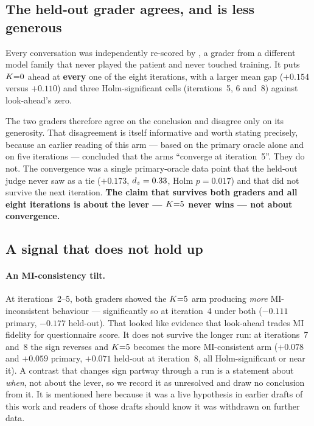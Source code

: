 \subsection{The held-out grader agrees, and is less generous}
Every conversation was independently re-scored by \heldout{}, a grader from a different model
family that never played the patient and never touched training. It puts $K{=}0$ ahead at
\textbf{every} one of the eight iterations, with a larger mean gap ($+0.154$ versus $+0.110$)
and three Holm-significant cells (iterations~5, 6 and~8) against look-ahead's zero.

The two graders therefore agree on the conclusion and disagree only on its generosity. That
disagreement is itself informative and worth stating precisely, because an earlier reading of
this arm --- based on the primary oracle alone and on five iterations --- concluded that the
arms ``converge at iteration~5''. They do not. The convergence was a single primary-oracle
data point that the held-out judge never saw as a tie ($+0.173$, $d_z = 0.33$, Holm
$p = 0.017$) and that did not survive the next iteration. \textbf{The claim that survives both
graders and all eight iterations is about the lever --- $K{=}5$ never wins --- not about
convergence.}

\subsection{A signal that does not hold up}

\paragraph{An MI-consistency tilt.}
At iterations~2--5, both graders showed the $K{=}5$ arm producing \emph{more} MI-inconsistent
behaviour --- significantly so at iteration~4 under both ($-0.111$ primary, $-0.177$ held-out).
That looked like evidence that look-ahead trades MI fidelity for questionnaire score. It does
not survive the longer run: at iterations~7 and~8 the sign reverses and $K{=}5$ becomes the
more MI-consistent arm ($+0.078$ and $+0.059$ primary, $+0.071$ held-out at iteration~8, all
Holm-significant or near it). A contrast that changes sign partway through a run is a statement
about \emph{when}, not about the lever, so we record it as unresolved and draw no conclusion
from it. It is mentioned here because it was a live hypothesis in earlier drafts of this work
and readers of those drafts should know it was withdrawn on further data.

